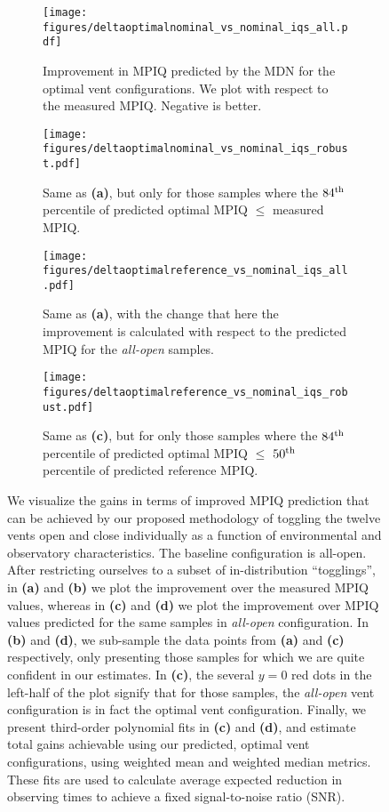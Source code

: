 \begin{figure*}
\begin{subfigure}{0.49\textwidth}
    \centering
    \texttt{[image: figures/deltaoptimalnominal\_vs\_nominal\_iqs\_all.pdf]}
    \caption{Improvement in MPIQ predicted by the MDN for the optimal vent configurations.  We plot with respect to the measured MPIQ. Negative is better.}
    \label{fig:common_deltaoptimalnominal_vs_nominal_iqs}
\end{subfigure}
\hfill
\begin{subfigure}{0.49\textwidth}
    \centering
    \texttt{[image: figures/deltaoptimalnominal\_vs\_nominal\_iqs\_robust.pdf]}
    \caption{Same as \textbf{(a)}, but  only for those samples where the $84^{\rm th}$ percentile of predicted optimal MPIQ $\leq$ measured MPIQ.}
    \label{fig:common_deltaoptimalnominal_vs_nominal_iqs_robust}
\end{subfigure}
\newline
\begin{subfigure}{0.49\textwidth}
    \centering
    \texttt{[image: figures/deltaoptimalreference\_vs\_nominal\_iqs\_all.pdf]}
    \caption{Same as \textbf{(a)}, with the change that here the improvement is calculated with respect to the predicted MPIQ for the \textit{all-open} samples.}
    \label{fig:common_deltaoptimalreference_vs_nominal_iqs}
\end{subfigure}
\hfill
\begin{subfigure}{0.49\textwidth}
    \centering
    \texttt{[image: figures/deltaoptimalreference\_vs\_nominal\_iqs\_robust.pdf]}
    \caption{Same as \textbf{(c)}, but for only those samples where the $84^{\rm th}$ percentile of predicted optimal MPIQ $\leq$ $50^{\rm th}$ percentile of predicted reference MPIQ.}
    \label{fig:common_deltaoptimalreference_vs_nominal_iqs_robust}
\end{subfigure}
\caption{We visualize the gains in terms of improved MPIQ prediction that can be achieved by our proposed methodology of toggling the twelve vents open and close individually as a function of environmental and observatory characteristics. The baseline configuration is all-open. After restricting ourselves to a subset of in-distribution ``togglings'', in \textbf{(a)} and \textbf{(b)} we plot the improvement over the measured MPIQ values, whereas in \textbf{(c)} and \textbf{(d)} we plot the improvement over MPIQ values predicted for the same samples in \textit{all-open} configuration. In \textbf{(b)} and \textbf{(d)}, we sub-sample the data points from \textbf{(a)} and \textbf{(c)} respectively, only presenting those samples for which we are quite confident in our estimates. In \textbf{(c)}, the several $y=0$ red dots in the left-half of the plot signify that for those samples, the \textit{all-open} vent configuration is in fact the optimal vent configuration. Finally, we present third-order polynomial fits in \textbf{(c)} and \textbf{(d)}, and estimate total gains achievable using our predicted, optimal vent configurations, using weighted mean and weighted median metrics. These fits are used to calculate average expected reduction in observing times to achieve a fixed signal-to-noise ratio (SNR).}

\end{figure*}
